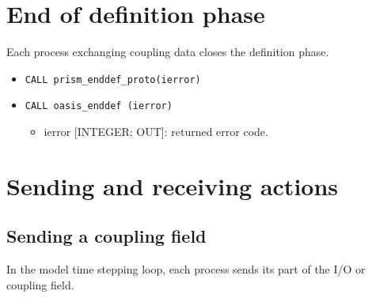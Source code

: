 \section{End of definition phase}
\label{subsubsec_Endofdefinition}
Each process exchanging coupling data closes the definition phase.
\begin{itemize}
\item {\tt CALL prism\_enddef\_proto(ierror)}
\item {\tt CALL oasis\_enddef       (ierror)}
\begin{itemize}
  \item ierror [INTEGER; OUT]: returned error code.
\end{itemize}
\end{itemize}


\section{Sending and receiving actions}
\label{subsubsec_sendingreceiving}

\subsection{Sending a coupling field}
\label{prismput}

In the model time stepping loop, each process 
sends its part of the I/O or coupling field. 

